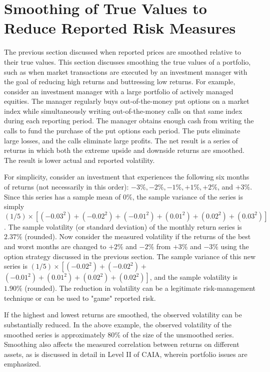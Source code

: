 \documentclass[11pt]{article}
\begin{document}
\section*{Smoothing of True Values to Reduce Reported Risk Measures}
The previous section discussed when reported prices are smoothed relative to their true values. This section discusses smoothing the true values of a portfolio, such as when market transactions are executed by an investment manager with the goal of reducing high returns and buttressing low returns. For example, consider an investment manager with a large portfolio of actively managed equities. The manager regularly buys out-of-the-money put options on a market index while simultaneously writing out-of-the-money calls on that same index during each reporting period. The manager obtains enough cash from writing the calls to fund the purchase of the put options each period. The puts eliminate large losses, and the calls eliminate large profits. The net result is a series of returns in which both the extreme upside and downside returns are smoothed. The result is lower actual and reported volatility.

For simplicity, consider an investment that experiences the following six months of returns (not necessarily in this order): $-3 \%,-2 \%,-1 \%,+1 \%,+2 \%$, and $+3 \%$. Since this series has a sample mean of $0 \%$, the sample variance of the series is simply $(1 / 5) \times\left[\left(-0.03^{2}\right)+\left(-0.02^{2}\right)+\left(-0.01^{2}\right)+\left(0.01^{2}\right)+\left(0.02^{2}\right)+\left(0.03^{2}\right)\right]$. The sample volatility (or standard deviation) of the monthly return series is $2.37 \%$ (rounded). Now consider the measured volatility if the returns of the best and worst months are changed to $+2 \%$ and $-2 \%$ from $+3 \%$ and $-3 \%$ using the option strategy discussed in the previous section. The sample variance of this new series is $(1 / 5) \times\left[\left(-0.02^{2}\right)+\left(-0.02^{2}\right)+\right.$ $\left.\left(-0.01^{2}\right)+\left(0.01^{2}\right)+\left(0.02^{2}\right)+\left(0.02^{2}\right)\right]$, and the sample volatility is $1.90 \%$ (rounded). The reduction in volatility can be a legitimate risk-management technique or can be used to "game" reported risk.

If the highest and lowest returns are smoothed, the observed volatility can be substantially reduced. In the above example, the observed volatility of the smoothed series is approximately $80 \%$ of the size of the unsmoothed series. Smoothing also affects the measured correlation between returns on different assets, as is discussed in detail in Level II of CAIA, wherein portfolio issues are emphasized.
\end{document}
